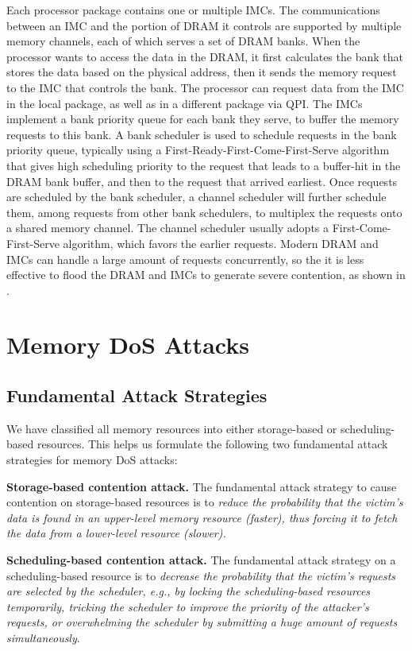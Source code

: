 \documentclass{sig-alternate}
\newcommand{\bheading}[1]{{\vspace{2pt}\noindent{\textbf{#1}}\hspace{2pt}}}
\newcommand{\attackname}{memory DoS attacks\xspace}
\newenvironment{packeditemize}{
\begin{list}{}{
\setlength{\labelwidth}{8pt}
\setlength{\itemsep}{0pt}
\setlength{\leftmargin}{\labelwidth}
\addtolength{\leftmargin}{\labelsep}
\setlength{\parindent}{0pt}
\setlength{\listparindent}{\parindent}
\setlength{\parsep}{0pt}
\setlength{\topsep}{3pt}}}{\end{list}}
\begin{document}
\bheading{Integrated Memory Controllers (IMC).}
Each processor package contains one or multiple IMCs. The communications between an IMC and the portion of DRAM it controls are supported by multiple memory channels, each of which serves a set of DRAM banks. When the processor wants to access the data in the DRAM, it first calculates the bank that stores the data based on the physical address, then it sends the memory request to the IMC that controls the bank. The processor can request data from the IMC in the local package, as well as in a different package via QPI. The IMCs implement a bank priority queue for each bank they serve, to buffer the memory requests to this bank. A bank scheduler is used to schedule requests in the bank priority queue, typically using a First-Ready-First-Come-First-Serve algorithm that gives high scheduling priority to the request that leads to a buffer-hit in the DRAM bank buffer, and then to the request that arrived earliest. Once requests are scheduled by the bank scheduler, a channel scheduler will further schedule them, among requests from other bank schedulers, to multiplex the requests onto a shared memory channel. The channel scheduler usually adopts a First-Come-First-Serve algorithm, which favors the earlier requests. Modern DRAM and IMCs can handle a large amount of requests concurrently, so the it is less effective to flood the DRAM and IMCs to generate severe contention, as shown in \cite{MoMu:07}. 


\section{Memory DoS Attacks}
\label{sec:separate_attack}

\subsection{Fundamental Attack Strategies}
\label{sec:attack_strategies}
We have classified all memory resources into either storage-based or scheduling-based resources. This helps us formulate the following two fundamental attack strategies for \attackname:

\begin{packeditemize}

\item \textbf{Storage-based contention attack.} The fundamental attack strategy to cause contention on storage-based resources is to \emph{reduce the probability that the victim's data is found in an upper-level memory resource (faster), thus forcing it to fetch the data from a lower-level resource (slower).}

\item \textbf{Scheduling-based contention attack.} The fundamental attack strategy on a scheduling-based resource is to \emph{decrease the probability that the victim's requests are selected by the scheduler, e.g., by locking the scheduling-based resources temporarily, tricking the scheduler to improve the priority of the attacker's requests, or overwhelming the scheduler by submitting a huge amount of requests simultaneously}.

\end{packeditemize}
\end{document}

